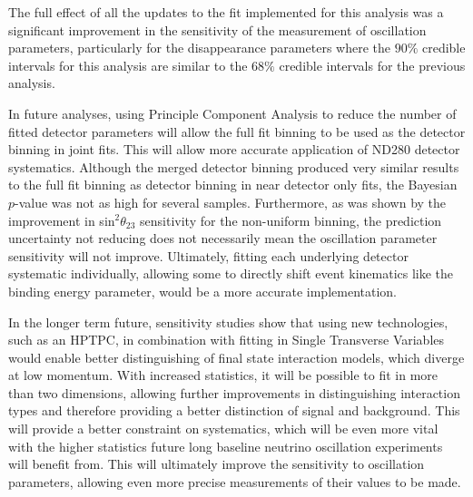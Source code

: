 The full effect of all the updates to the fit implemented for this analysis was a significant improvement in the sensitivity of the measurement of oscillation parameters, particularly for the disappearance parameters where the $90\%$ credible intervals for this analysis are similar to the $68\%$ credible intervals for the previous analysis.

In future analyses, using Principle Component Analysis to reduce the number of fitted detector parameters will allow the full fit binning to be used as the detector binning in joint fits. This will allow more accurate application of ND280 detector systematics. Although the merged detector binning produced very similar results to the full fit binning as detector binning in near detector only fits, the Bayesian $p$-value was not as high for several samples. Furthermore, as was shown by the improvement in sin$^2\theta_{23}$ sensitivity for the non-uniform binning, the \SK prediction uncertainty not reducing does not necessarily mean the oscillation parameter sensitivity will not improve. Ultimately, fitting each underlying detector systematic individually, allowing some to directly shift event kinematics like the binding energy parameter, would be a more accurate implementation.

In the longer term future, sensitivity studies show that using new technologies, such as an HPTPC, in combination with fitting in Single Transverse Variables would enable better distinguishing of final state interaction models, which diverge at low momentum. With increased statistics, it will be possible to fit in more than two dimensions, allowing further improvements in distinguishing interaction types and therefore providing a better distinction of signal and background. This will provide a better constraint on systematics, which will be even more vital with the higher statistics future long baseline neutrino oscillation experiments will benefit from. This will ultimately improve the sensitivity to oscillation parameters, allowing even more precise measurements of their values to be made. 

\newpage